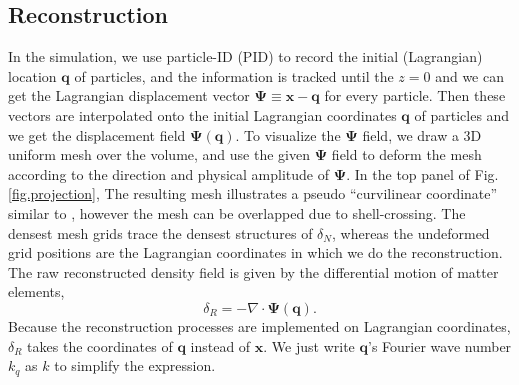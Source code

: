 \documentclass[aps,prd,twocolumn,superscriptaddress,amsfont,amssymb,amsmath,nofootinbib,showpacs,balancelastpage]{revtex4-1}
\newcommand{\bs}{\boldsymbol}
\begin{document}
\subsection{Reconstruction}\label{ss.reco}
In the simulation, we use particle-ID (PID) to record the initial (Lagrangian) location ${\bs 
q}$ of particles, and the information is tracked until the $z=0$ and we can get the 
Lagrangian displacement vector ${\bs \Psi}\equiv{\bs x}-{\bs q}$ for every 
particle. Then these vectors are interpolated onto the initial Lagrangian 
coordinates ${\bs q}$ of particles and we get the displacement field ${\bs \Psi}
({\bs q})$.
To visualize the $\bs\Psi$ field, we draw a 3D uniform mesh over the volume,
and use the given $\bs\Psi$ field to deform the mesh according to the direction
and physical amplitude of $\bs\Psi$. In the top panel of Fig.\ref{fig.projection},
The resulting mesh illustrates a pseudo
``curvilinear coordinate'' similar to \cite{1995ApJS..100..269P},
however the mesh can be overlapped due to shell-crossing. The densest mesh grids
trace the densest structures of $\delta_N$, whereas the undeformed grid positions
are the Lagrangian coordinates in which we do the reconstruction.
The raw reconstructed density field is given by the differential motion of matter 
elements,
\begin{equation}
    \delta_R=-\nabla\cdot{\bs \Psi}({\bs q}).
\end{equation}
Because the reconstruction processes are implemented on Lagrangian coordinates,
$\delta_R$ takes the coordinates of $\bs q$ instead of $\bs x$.
We just write $\bs q$'s Fourier wave number
$k_q$ as $k$ to simplify the expression.
\end{document}

